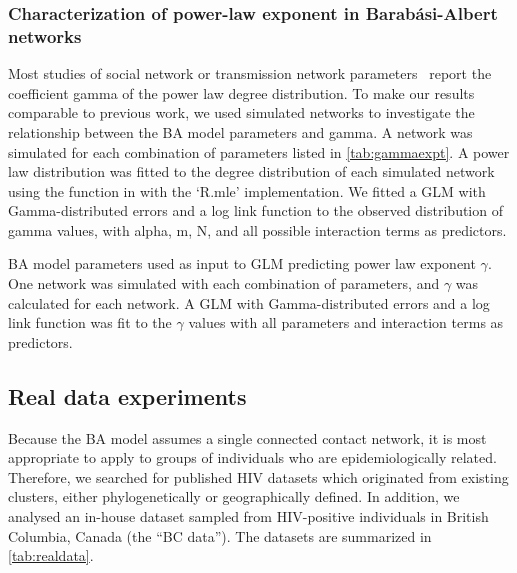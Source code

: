 \subsubsection*{Characterization of power-law exponent in Barab\'asi-Albert networks}

Most studies of social network or transmission network
parameters~\autocite[e.g.][]{liljeros2001web, jones2003assessment,
schneeberger2004scale, brown2011transmission} report the coefficient
\gls{gamma} of the power law degree distribution. To make our results
comparable to previous work, we used simulated networks to investigate the
relationship between the \gls{BA} model parameters and \gls{gamma}. A network
was simulated for each combination of parameters listed in
\cref{tab:gammaexpt}. A power law distribution was fitted to the degree
distribution of each simulated network using the 
function in  with the `R.mle' implementation. We fitted a
\gls{GLM} with Gamma-distributed errors and a log link function to the observed
distribution of \gls{gamma} values, with \gls{alpha}, \gls{m}, \gls{N}, and all
possible interaction terms as predictors.

\begin{table}
  \centering
  
  \caption[\gls{BA} parameters used as input \gls{GLM} predicting $\gamma$]
  {
    \gls{BA} model parameters used as input to \gls{GLM} predicting power law
    exponent $\gamma$. One network was simulated with each combination of
    parameters, and $\gamma$ was calculated for each network. A \gls{GLM} with
    Gamma-distributed errors and a log link function was fit to the $\gamma$
    values with all parameters and interaction terms as predictors.
  }
  \label{tab:gammaexpt}
\end{table}

\subsection{Real data experiments}

Because the \gls{BA} model assumes a single connected contact network, it is
most appropriate to apply to groups of individuals who are epidemiologically
related. Therefore, we searched for published \gls{HIV} datasets which
originated from existing clusters, either phylogenetically or geographically
defined. In addition, we analysed an in-house dataset sampled from
\gls{HIV}-positive individuals in British Columbia, Canada (the ``BC data'').
The datasets are summarized in \cref{tab:realdata}.

